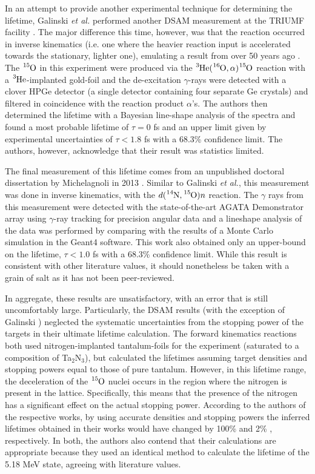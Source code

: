 In an attempt to provide another experimental technique for determining the lifetime, Galinski \textit{et al.} performed another DSAM measurement at the TRIUMF facility \cite{Galinski2014}. The major difference this time, however, was that the reaction occurred in inverse kinematics (i.e. one where the heavier reaction input is accelerated towards the stationary, lighter one), emulating a result from over 50 years ago \cite{Gill1968}. The $\ce{^{15}O}$ in this experiment were produced via the $\ce{^{3}He}(\ce{^{16}O},\alpha)\ce{^{15}O}$ reaction with a $\ce{^{3}He}$-implanted gold-foil and the de-excitation $\gamma$-rays were detected with a clover HPGe detector (a single detector containing four separate Ge crystals) and filtered in coincidence with the reaction product $\alpha$'s. The authors then determined the lifetime with a Bayesian line-shape analysis of the spectra and found a most probable lifetime of $\tau = 0$ fs and an upper limit given by experimental uncertainties of $\tau < 1.8$ fs with a 68.3\% confidence limit. The authors, however, acknowledge that their result was statistics limited.

The final measurement of this lifetime comes from an unpublished doctoral dissertation by Michelagnoli in 2013 \cite{Michelagnoli2013}. Similar to Galinski \textit{et al.}, this measurement was done in inverse kinematics, with the $d(\ce{^{14}N},\ce{^{15}O})n$ reaction. The $\gamma$ rays from this measurement were detected with the state-of-the-art AGATA Demonstrator array using $\gamma$-ray tracking for precision angular data and a lineshape analysis of the data was performed by comparing with the results of a Monte Carlo simulation in the Geant4 software. This work also obtained only an upper-bound on the lifetime, $\tau < 1.0$ fs with a 68.3\% confidence limit. While this result is consistent with other literature values, it should nonetheless be taken with a grain of salt as it has not been peer-reviewed. 

In aggregate, these results are unsatisfactory, with an error that is still uncomfortably large. Particularly, the DSAM results (with the exception of Galinski \cite{Galinski2014}) neglected the systematic uncertainties from the stopping power of the targets in their ultimate lifetime calculation. The forward kinematics reactions \cite{Bertone2001, Schurmann2008} both used nitrogen-implanted tantalum-foils for the experiment (saturated to a composition of Ta$_{2}$N$_{3}$), but calculated the lifetimes assuming target densities and stopping powers equal to those of pure tantalum. However, in this lifetime range, the deceleration of the $\ce{^{15}O}$ nuclei occurs in the region where the nitrogen is present in the lattice. Specifically, this means that the presence of the nitrogen has a significant effect on the actual stopping power. According to the authors of the respective works, by using accurate densities and stopping powers the inferred lifetimes obtained in their works would have changed by 100\% \cite{Bertone2001} and 2\% \cite{Schurmann2008}, respectively. In both, the authors also contend that their calculations are appropriate because they used an identical method to calculate the lifetime of the 5.18 MeV state, agreeing with literature values.




